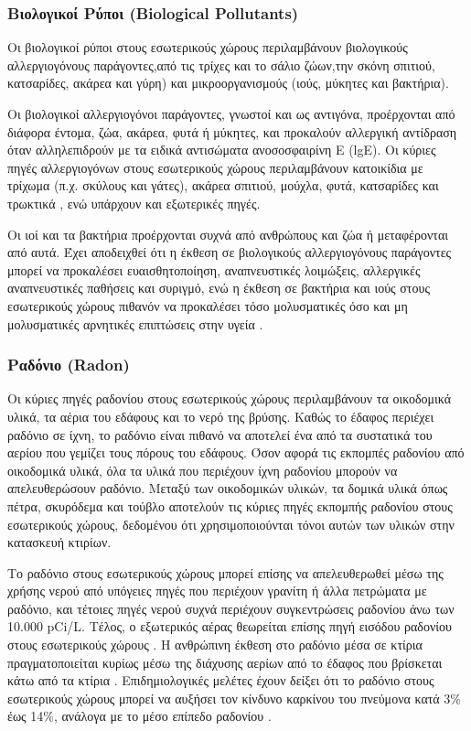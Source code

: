 \subsubsection{Βιολογικοί Ρύποι (Biological Pollutants)}


Οι βιολογικοί ρύποι στους εσωτερικούς χώρους περιλαμβάνουν βιολογικούς αλλεργιογόνους παράγοντες,από τις τρίχες και το σάλιο ζώων,την σκόνη σπιτιού, κατσαρίδες, ακάρεα και γύρη) και μικροοργανισμούς (ιούς, μύκητες και βακτήρια).

Οι βιολογικοί αλλεργιογόνοι παράγοντες, γνωστοί και ως αντιγόνα, προέρχονται από διάφορα έντομα, ζώα, ακάρεα, φυτά ή μύκητες, και προκαλούν αλλεργική αντίδραση όταν αλληλεπιδρούν με τα ειδικά αντισώματα ανοσοσφαιρίνη E (lgE). Οι κύριες πηγές αλλεργιογόνων στους εσωτερικούς χώρους περιλαμβάνουν κατοικίδια με τρίχωμα (π.χ. σκύλους και γάτες), ακάρεα σπιτιού, μούχλα, φυτά, κατσαρίδες και τρωκτικά , ενώ υπάρχουν και εξωτερικές πηγές.

Οι ιοί και τα βακτήρια προέρχονται συχνά από ανθρώπους και ζώα ή μεταφέρονται από αυτά. Έχει αποδειχθεί ότι η έκθεση σε βιολογικούς αλλεργιογόνους παράγοντες μπορεί να προκαλέσει ευαισθητοποίηση, αναπνευστικές λοιμώξεις, αλλεργικές αναπνευστικές παθήσεις και συριγμό, ενώ η έκθεση σε βακτήρια και ιούς στους εσωτερικούς χώρους πιθανόν να προκαλέσει τόσο μολυσματικές όσο και μη μολυσματικές αρνητικές επιπτώσεις στην υγεία \cite{ijerph17082927}.

\subsubsection{Ραδόνιο (Radon)}

Οι κύριες πηγές ραδονίου στους εσωτερικούς χώρους περιλαμβάνουν τα οικοδομικά υλικά, τα αέρια του εδάφους και το νερό της βρύσης. Καθώς το έδαφος περιέχει ραδόνιο σε ίχνη, το ραδόνιο είναι πιθανό να αποτελεί ένα από τα συστατικά του αερίου που γεμίζει τους πόρους του εδάφους. Όσον αφορά τις εκπομπές ραδονίου από οικοδομικά υλικά, όλα τα υλικά που περιέχουν ίχνη ραδονίου μπορούν να απελευθερώσουν ραδόνιο. Μεταξύ των οικοδομικών υλικών, τα δομικά υλικά όπως πέτρα, σκυρόδεμα και τούβλο αποτελούν τις κύριες πηγές εκπομπής ραδονίου στους εσωτερικούς χώρους, δεδομένου ότι χρησιμοποιούνται τόνοι αυτών των υλικών στην κατασκευή κτιρίων.

Το ραδόνιο στους εσωτερικούς χώρους μπορεί επίσης να απελευθερωθεί μέσω της χρήσης νερού από υπόγειες πηγές που περιέχουν γρανίτη ή άλλα πετρώματα με ραδόνιο, και τέτοιες πηγές νερού συχνά περιέχουν συγκεντρώσεις ραδονίου άνω των 10.000 pCi/L. Τέλος, ο εξωτερικός αέρας θεωρείται επίσης πηγή εισόδου ραδονίου στους εσωτερικούς χώρους . Η ανθρώπινη έκθεση στο ραδόνιο μέσα σε κτίρια πραγματοποιείται κυρίως μέσω της διάχυσης αερίων από το έδαφος που βρίσκεται κάτω από τα κτίρια . Επιδημιολογικές μελέτες έχουν δείξει ότι το ραδόνιο στους εσωτερικούς χώρους μπορεί να αυξήσει τον κίνδυνο καρκίνου του πνεύμονα κατά 3\% έως 14\%, ανάλογα με το μέσο επίπεδο ραδονίου \cite{ijerph17082927}.

